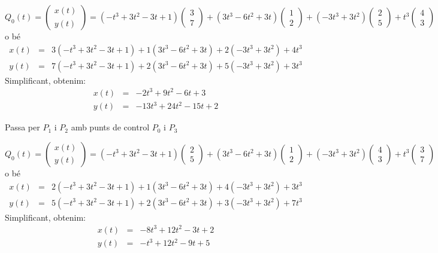 \begin{llista}
\begin{llista}
          \[
            Q_0(t)=\begin{pmatrix}x(t)\\y(t)\end{pmatrix}=(-t^3+3t^2-3t+1)\begin{pmatrix}3\\7\end{pmatrix}
                  +(3t^3-6t^2+3t)\begin{pmatrix}1\\2\end{pmatrix}
                  +(-3t^3+3t^2)\begin{pmatrix}2\\5\end{pmatrix}
                  +t^3\begin{pmatrix}4\\3\end{pmatrix}
          \]
          o bé
          \begin{eqnarray*}
            x(t)&=&3(-t^3+3t^2-3t+1)+1(3t^3-6t^2+3t)+2(-3t^3+3t^2)+4t^3\\
            y(t)&=&7(-t^3+3t^2-3t+1)+2(3t^3-6t^2+3t)+5(-3t^3+3t^2)+3t^3
          \end{eqnarray*}
          Simplificant, obtenim:
          \begin{eqnarray*}
            x(t)&=&-2t^3+9t^2-6t+3\\
            y(t)&=&-13t^3+24t^2-15t+2
          \end{eqnarray*}
          \blacksquare

  \item Passa per $P_1$ i $P_2$ amb punts de control $P_0$ i $P_3$


  \[
    Q_0(t)=\begin{pmatrix}x(t)\\y(t)\end{pmatrix}=(-t^3+3t^2-3t+1)\begin{pmatrix}2\\5\end{pmatrix}
          +(3t^3-6t^2+3t)\begin{pmatrix}1\\2\end{pmatrix}
          +(-3t^3+3t^2)\begin{pmatrix}4\\3\end{pmatrix}
          +t^3\begin{pmatrix}3\\7\end{pmatrix}
  \]
  o bé
  \begin{eqnarray*}
    x(t)&=&2(-t^3+3t^2-3t+1)+1(3t^3-6t^2+3t)+4(-3t^3+3t^2)+3t^3\\
    y(t)&=&5(-t^3+3t^2-3t+1)+2(3t^3-6t^2+3t)+3(-3t^3+3t^2)+7t^3
  \end{eqnarray*}
  Simplificant, obtenim:
  \begin{eqnarray*}
    x(t)&=&-8t^3+12t^2-3t+2\\
    y(t)&=&-t^3+12t^2-9t+5
  \end{eqnarray*}
\blacksquare



\end{llista}
\end{llista}
